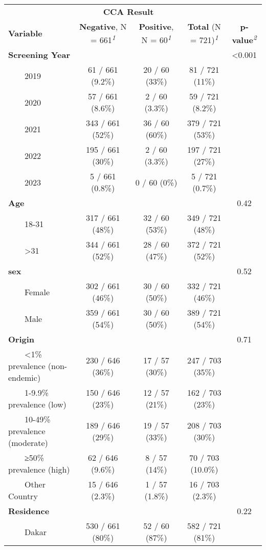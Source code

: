 \documentclass[
]{article}
\begin{document}
\setlength{\LTpost}{0mm}
\begin{longtable}{lcccc}
\toprule
 & \multicolumn{2}{c}{\textbf{CCA Result}} &  &  \\ 
\cmidrule(lr){2-3}
\textbf{Variable} & \textbf{Negative}, N = 661\textsuperscript{\textit{1}} & \textbf{Positive}, N = 60\textsuperscript{\textit{1}} & \textbf{Total} (N = 721)\textsuperscript{\textit{1}} & \textbf{p-value}\textsuperscript{\textit{2}} \\ 
\midrule\addlinespace[2.5pt]
\textbf{Screening Year} &  &  &  & <0.001 \\ 
    2019 & 61 / 661 (9.2\%) & 20 / 60 (33\%) & 81 / 721 (11\%) &  \\ 
    2020 & 57 / 661 (8.6\%) & 2 / 60 (3.3\%) & 59 / 721 (8.2\%) &  \\ 
    2021 & 343 / 661 (52\%) & 36 / 60 (60\%) & 379 / 721 (53\%) &  \\ 
    2022 & 195 / 661 (30\%) & 2 / 60 (3.3\%) & 197 / 721 (27\%) &  \\ 
    2023 & 5 / 661 (0.8\%) & 0 / 60 (0\%) & 5 / 721 (0.7\%) &  \\ 
\textbf{Age} &  &  &  & 0.42 \\ 
    18-31 & 317 / 661 (48\%) & 32 / 60 (53\%) & 349 / 721 (48\%) &  \\ 
    >31 & 344 / 661 (52\%) & 28 / 60 (47\%) & 372 / 721 (52\%) &  \\ 
\textbf{sex} &  &  &  & 0.52 \\ 
    Female & 302 / 661 (46\%) & 30 / 60 (50\%) & 332 / 721 (46\%) &  \\ 
    Male & 359 / 661 (54\%) & 30 / 60 (50\%) & 389 / 721 (54\%) &  \\ 
\textbf{Origin} &  &  &  & 0.71 \\ 
    <1\% prevalence (non-endemic) & 230 / 646 (36\%) & 17 / 57 (30\%) & 247 / 703 (35\%) &  \\ 
    1-9.9\% prevalence (low) & 150 / 646 (23\%) & 12 / 57 (21\%) & 162 / 703 (23\%) &  \\ 
    10-49\% prevalence (moderate) & 189 / 646 (29\%) & 19 / 57 (33\%) & 208 / 703 (30\%) &  \\ 
    ≥50\% prevalence (high) & 62 / 646 (9.6\%) & 8 / 57 (14\%) & 70 / 703 (10.0\%) &  \\ 
    Other Country & 15 / 646 (2.3\%) & 1 / 57 (1.8\%) & 16 / 703 (2.3\%) &  \\ 
\textbf{Residence} &  &  &  & 0.22 \\ 
    Dakar & 530 / 661 (80\%) & 52 / 60 (87\%) & 582 / 721 (81\%) &  \\ 

\end{longtable}
\end{document}
